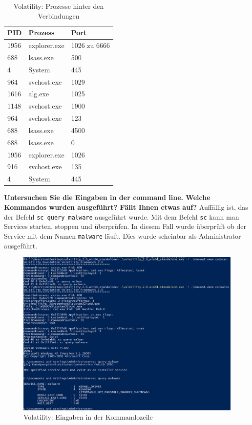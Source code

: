 \documentclass[
    a4paper,
    pagesize,
	pdftex,
    12pt,
]{scrartcl}
\begin{document}
\begin{table}[h!]
	\begin{center}
		\label{tab:process-port}
		\begin{tabular}{l|l |l }
			\textbf{PID} & \textbf{Prozess} & \textbf{Port} \\
			\hline
			1956 & explorer.exe & 1026 zu 6666 \\
			\hline
			688 & lsass.exe & 500 \\
			4 & System &  445\\
			964 & svchost.exe & 1029 \\
			1616 & alg.exe & 1025 \\
			1148 & svchost.exe & 1900 \\
			964 & svchost.exe & 123 \\
			688 & lsass.exe & 4500 \\
			688 & lsass.exe &  0 \\
			1956 & explorer.exe & 1026 \\
			916 & svchost.exe &  135\\
			4 & System &  445\\
		\end{tabular}
		\caption{Volatility: Prozesse hinter den Verbindungen}
	\end{center}
\end{table}
\textbf{Untersuchen Sie die Eingaben in der command line. Welche Kommandos wurden ausgeführt? Fällt Ihnen etwas auf?}
Auffällig ist, das der Befehl \lstinline[breaklines]|sc query malware| ausgeführt wurde. Mit dem Befehl \lstinline[breaklines]|sc| kann man Services starten, stoppen und überprüfen. In diesem Fall wurde überprüft ob der Service mit dem Namen \lstinline[breaklines]|malware| läuft. Dies wurde scheinbar als Administrator ausgeführt.
\begin{figure}[H]
	\centering
	\includegraphics[width=18cm]{vol-cmd-history.png}
	\caption{Volatility: Eingaben in der Kommandozeile}
	\label{fig:vol-cmd-history}
\end{figure} 
\end{document}
